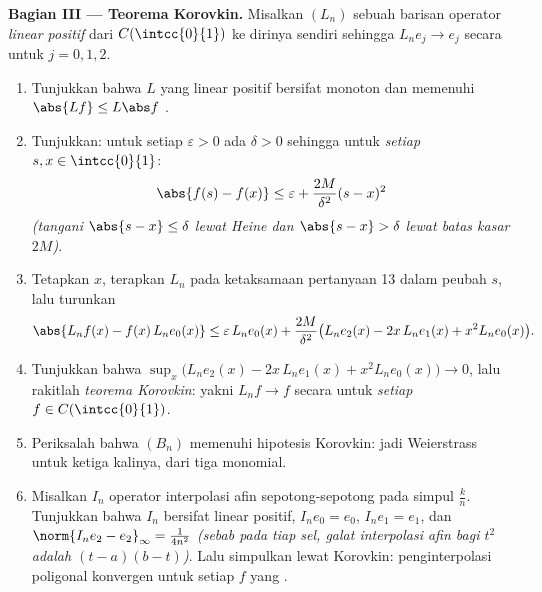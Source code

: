 \begin{problem}
\medskip
\noindent\textbf{Bagian III --- Teorema Korovkin.} Misalkan $(L_n)$
sebuah barisan operator \emph{linear positif} dari
$C(\intcc{0}{1})$ ke dirinya sendiri sehingga $L_ne_j \to e_j$
secara  untuk $j = 0, 1, 2$.
\begin{enumerate}[resume]
  \item Tunjukkan bahwa $L$ yang linear positif bersifat monoton dan
        memenuhi $\abs{Lf} \leq L\abs f$ .
  \item Tunjukkan: untuk setiap $\varepsilon > 0$ ada $\delta > 0$
        sehingga untuk \emph{setiap} $s, x \in \intcc{0}{1}$:
        \[
        \abs{f(s) - f(x)} \leq \varepsilon +
        \frac{2M}{\delta^2}(s - x)^2
        \]
        \emph{(tangani $\abs{s - x} \leq \delta$ lewat Heine dan
        $\abs{s-x} > \delta$ lewat batas kasar $2M$)}.
  \item Tetapkan $x$, terapkan $L_n$ pada ketaksamaan pertanyaan 13
        dalam peubah $s$, lalu turunkan
        \[
        \abs{L_nf(x) - f(x)\,L_ne_0(x)}
        \leq \varepsilon\,L_ne_0(x) + \frac{2M}{\delta^2}
        \bigl(L_ne_2(x) - 2x\,L_ne_1(x) + x^2 L_ne_0(x)\bigr).
        \]
  \item Tunjukkan bahwa $\sup_x \bigl(L_ne_2(x) - 2x\,L_ne_1(x) + x^2
        L_ne_0(x)\bigr) \to 0$, lalu rakitlah
        \emph{teorema Korovkin}: yakni $L_nf \to f$ secara  untuk
        \emph{setiap} $f \in C(\intcc{0}{1})$.
  \item Periksalah bahwa $(B_n)$ memenuhi hipotesis Korovkin:
        jadi Weierstrass untuk ketiga kalinya, dari tiga monomial.
  \item Misalkan $I_n$ operator interpolasi afin
        sepotong-sepotong pada simpul $\frac kn$. Tunjukkan bahwa $I_n$
        bersifat linear positif, $I_ne_0 = e_0$, $I_ne_1 = e_1$, dan
        $\norm{I_ne_2 - e_2}_\infty = \frac{1}{4n^2}$
        \emph{(sebab pada tiap sel, galat interpolasi afin
        bagi $t^2$ adalah $(t - a)(b - t)$)}. Lalu simpulkan lewat
        Korovkin: penginterpolasi poligonal konvergen  untuk
        setiap $f$ yang .
\end{enumerate}


\end{problem}
